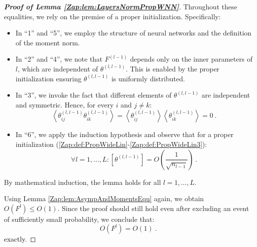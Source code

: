 \documentclass{article} %
\begin{document}
\begin{proof}[\textbf{Proof of Lemma \ref{Zap:lem:LayersNormPropWNN}}]
Throughout these equalities, we rely on the premise of a proper initialization. Specifically:

\begin{itemize}

\item
In ``1'' and ``5'', we employ the structure of neural networks and the definition of the moment norm.

\item
In ``2'' and ``4'', we note that \(F^{(l-1)}\) depends only on the inner parameters of \(l\), which are independent of \(\theta^{(l,l-1)}\). This is enabled by the proper initialization ensuring \(\theta^{(l,l-1)}\) is uniformly distributed.

\item
In ``3'', we invoke the fact that different elements of \(\theta^{(l,l-1)}\) are independent and symmetric. Hence, for every \(i\) and \(j \neq k\):
\begin{equation}
\left\langle \theta_{ij}^{\left(l,l-1\right)}\theta_{ik}^{\left(l,l-1\right)}\right\rangle =\left\langle \theta_{ij}^{\left(l,l-1\right)}\right\rangle \left\langle \theta_{ik}^{\left(l,l-1\right)}\right\rangle =0 \ .
\end{equation}

\item
In ``6'', we apply the induction hypothesis and observe that for a proper initialization (\ref{Zap:def:PropWideLin}-\ref{Zap:def:PropWideLin3}):
\begin{equation}
\forall l=1,\ldots,L:\left[\theta^{\left(l,l-1\right)}\right]=O\left(\frac{1}{\sqrt{n_{l-1}}}\right) \ .
\end{equation}
\end{itemize}

By mathematical induction, the lemma holds for all \(l=1,\ldots,L\).

Using Lemma \ref{Zap:lem:AsympAndMomentsEqu} again, we obtain \(O\left(F^{l}\right)\leq O\left(1\right)\). Since the proof should still hold even after excluding an event of sufficiently small probability, we conclude that:
\begin{equation}
O\left(F^{l}\right)=O\left(1\right) \ .
\end{equation}
\textcolor{black}{exactly}.

\end{proof}
\end{document}
